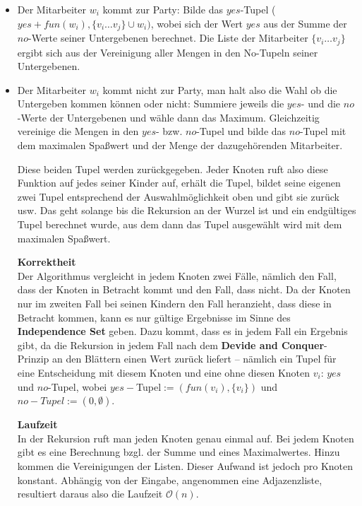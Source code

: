 \documentclass[a4paper, fontsize=10pt]{scrartcl}
\begin{document}
\begin{itemize}
  \item Der Mitarbeiter $w_i$ kommt zur Party: Bilde das $yes$-Tupel ($yes+fun(w_i),\{v_i\dots v_j\}\cup {w_i})$, wobei sich der Wert $yes$ aus der Summe der $no$-Werte seiner Untergebenen berechnet. Die Liste der Mitarbeiter $\{v_i\dots v_j\}$ ergibt sich aus der Vereinigung aller Mengen in den No-Tupeln seiner Untergebenen.  
  \item Der Mitarbeiter $w_i$ kommt nicht zur Party, man halt also die Wahl ob die Untergeben kommen können oder nicht: Summiere jeweils die $yes$- und die $no$-Werte der Untergebenen und wähle dann das Maximum. Gleichzeitig vereinige die Mengen in den $yes$- bzw. $no$-Tupel und bilde das $no$-Tupel mit dem maximalen Spaßwert und der Menge der dazugehörenden Mitarbeiter.
  
Diese beiden Tupel werden zurückgegeben. Jeder Knoten ruft also diese Funktion auf jedes seiner Kinder auf, erhält die Tupel, bildet seine eigenen zwei Tupel entsprechend der Auswahlmöglichkeit oben und gibt sie zurück usw. Das geht solange bis die Rekursion an der Wurzel ist und ein endgültiges Tupel berechnet wurde, aus dem dann das Tupel ausgewählt wird mit dem maximalen Spaßwert. \bigskip

\textbf{Korrektheit}\\
Der Algorithmus vergleicht in jedem Knoten zwei Fälle, nämlich den Fall, dass der Knoten in Betracht kommt und den Fall, dass nicht. Da der Knoten nur im zweiten Fall bei seinen Kindern den Fall heranzieht, dass diese in Betracht kommen, kann es nur gültige Ergebnisse im Sinne des \textbf{Independence Set} geben. Dazu kommt, dass es in jedem Fall ein Ergebnis gibt, da die Rekursion in jedem Fall nach dem \textbf{Devide and Conquer}-Prinzip an den Blättern einen Wert zurück liefert -- nämlich ein Tupel für eine Entscheidung mit diesem Knoten und eine ohne diesen Knoten $v_i$: $yes$ und $no$-Tupel, wobei $yes-$Tupel$:=(fun(v_i),\{v_i\})$ und $no-Tupel:=(0,\emptyset)$.\smallskip

\textbf{Laufzeit}\\
In der Rekursion ruft man jeden Knoten genau einmal auf. Bei jedem Knoten gibt es eine Berechnung bzgl. der Summe und eines Maximalwertes. Hinzu kommen die Vereinigungen der Listen. Dieser Aufwand ist jedoch pro Knoten konstant. Abhängig von der Eingabe, angenommen eine Adjazenzliste, resultiert daraus also die Laufzeit $\mathcal{O}(n)$.


\end{itemize}
\end{document}
